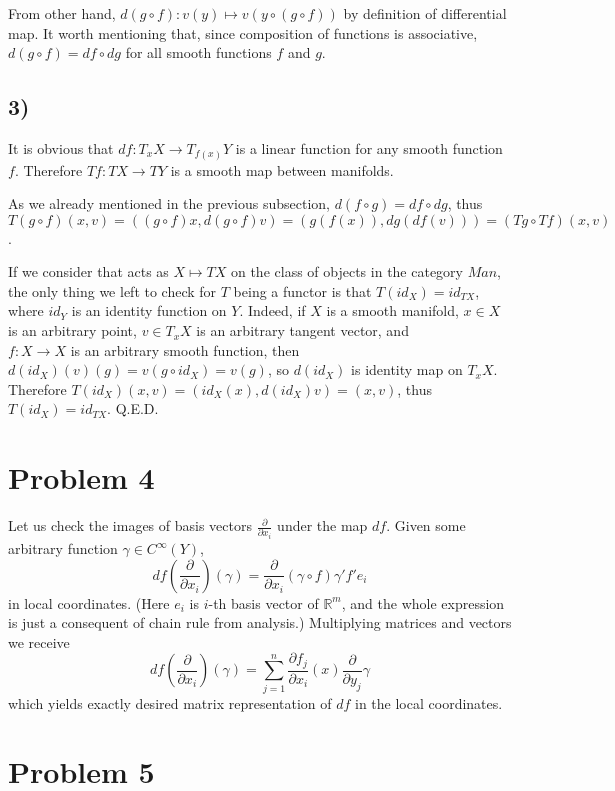 \documentclass{article}[14pt]
\begin{document}
From other hand, $d(g \circ f): v(y) \mapsto v(y \circ (g \circ f))$ by definition of differential map.
It worth mentioning that, since composition of functions is associative, $d(g \circ f) = df \circ dg$ for all smooth functions $f$ and $g$.

\subsection{3)}

It is obvious that $df: T_x X \rightarrow T_{f(x)}Y$ is a linear function for any smooth function $f$.
Therefore $Tf: TX \rightarrow TY$ is a smooth map between manifolds.

As we already mentioned in the previous subsection, $d(f \circ g) = df \circ dg$,
thus $T(g \circ f)(x, v) = ((g \circ f)x, d(g \circ f)v) = (g(f(x)), dg(df(v))) = (Tg \circ Tf)(x, v)$.

If we consider that acts as $X \mapsto TX$ on the class of objects in the category $Man$, the only thing we left to check for $T$ being a functor is that $T(id_{X}) = id_{TX}$,
where $id_Y$ is an identity function on $Y$.
Indeed, if $X$ is a smooth manifold, $x \in X$ is an arbitrary point, $v \in T_x X$ is an arbitrary tangent vector, and \\ $f: X \rightarrow X$ is an arbitrary smooth function,
then $d(id_X)(v)(g) = v(g \circ id_X) = v(g)$, so $d(id_X)$ is identity map on $T_x X$.
Therefore $T (id_X) (x, v) = (id_X (x), d(id_X)v) = (x, v)$, thus $T (id_X) = id_{TX}$. Q.E.D.

\section{Problem 4}

Let us check the images of basis vectors $\frac{\partial}{\partial x_i}$ under the map $df$.
Given some arbitrary function $\gamma \in C^\infty (Y)$, 
$$df(\frac{\partial}{\partial x_i})(\gamma) = \frac{\partial}{\partial x_i} (\gamma \circ f) \gamma' f' e_i$$ in local coordinates.
(Here $e_i$ is $i$-th basis vector of $\mathbb R^m$, and the whole expression is just a consequent of chain rule from analysis.)
Multiplying matrices and vectors we receive 
$$df(\frac{\partial}{\partial x_i})(\gamma) = \sum_{j=1}^n \frac{\partial f_j}{\partial x_i}(x) \frac{\partial}{\partial y_j}\gamma$$
which yields exactly desired matrix representation of $df$ in the local coordinates.

\section{Problem 5}
\end{document}
